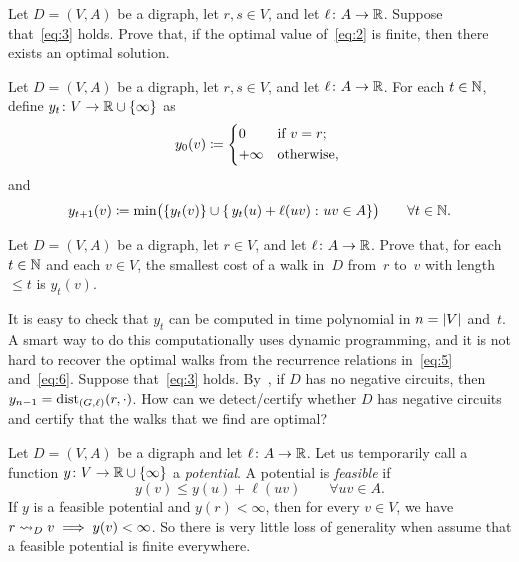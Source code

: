 \documentclass[10pt,reqno]{amsart}
\begin{document}
\begin{exercise}
  \label{ex:4}
  Let \(D = (V,A)\) be a digraph, let \(r,s \in V\), and let
  \(\ell \colon A \to \mathbb{R}\).  Suppose that~\eqref{eq:3} holds.
  Prove that, if the optimal value of~\eqref{eq:2} is finite, then
  there exists an optimal solution.
\end{exercise}

Let \(D = (V,A)\) be a digraph, let \(r,s \in V\), and let
\(\ell \colon A \to \mathbb{R}\).  For each \(t \in \mathbb{N}\), define
\(y_t \colon V \to \mathbb{R} \cup \{\infty\}\) as
\begin{equation}
  \label{eq:5}
  y_0(v)
  \coloneqq
  \begin{cases*}
    0       & if \(v = r\); \\
    +\infty & otherwise,    \\
  \end{cases*}
\end{equation}
and
\begin{equation}
  \label{eq:6}
  y_{t+1}(v)
  \coloneqq
  \min\paren[\big]{
    \set{y_t(v)}
    \cup
    \setst{
      y_t(u) + \ell(uv)
    }{
      uv \in A
    }}
  \qquad
  \forall t \in \Naturals.
\end{equation}

\begin{exercise}
  \label{ex:5}
  Let \(D = (V,A)\) be a digraph, let \(r \in V\), and let
  \(\ell \colon A \to \mathbb{R}\).  Prove that, for each
  \(t \in \mathbb{N}\) and each \(v \in V\), the smallest cost of a
  walk in~\(D\) from~\(r\) to~\(v\) with length \(\leq t\) is
  \(y_t(v)\).
\end{exercise}

It is easy to check that \(y_t\) can be computed in time polynomial in
\(n = \lvert V\rvert\) and~\(t\).  A smart way to do this computationally
uses dynamic programming, and it is not hard to recover the optimal
walks from the recurrence relations in~\eqref{eq:5} and~\eqref{eq:6}.
Suppose that~\eqref{eq:3} holds.  By~, if
\(D\) has no negative circuits, then
\(y_{n-1} = \operatorname{dist}_{(G,\ell)}(r,\cdot)\).  How can we detect/certify
whether \(D\) has negative circuits and certify that the walks that we
find are optimal?

Let \(D = (V,A)\) be a digraph and let \(\ell \colon A \to \mathbb{R}\).
Let us temporarily call a function
\(y \colon V \to \mathbb{R} \cup \{\infty\}\) a \emph{potential}.  A
potential is \emph{feasible} if
\begin{equation*}
  y(v) \leq y(u) + \ell(uv)
  \qquad
  \forall uv \in A.
\end{equation*}
If \(y\) is a feasible potential and \(y(r) < \infty\), then for every
\(v \in V\), we have \(r \rightsquigarrow_D v \implies y(v) < \infty\).  So
there is very little loss of generality when assume that a feasible
potential is finite everywhere.
\end{document}
